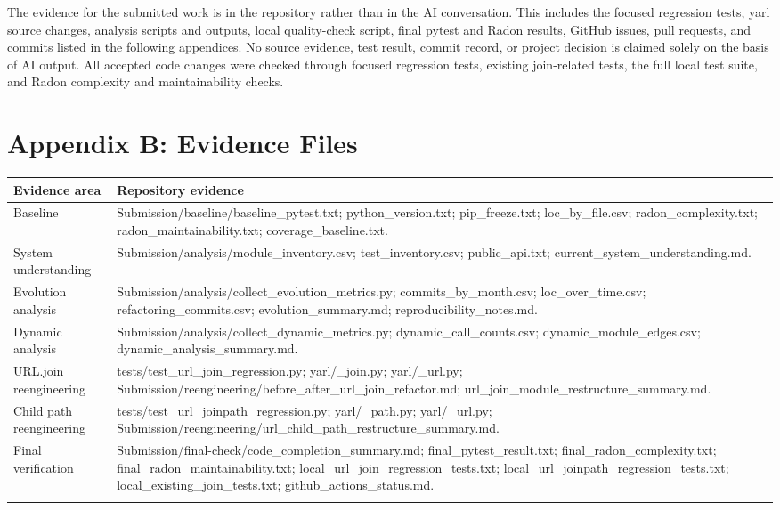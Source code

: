 \documentclass[11pt,a4paper]{article}
\begin{document}
The evidence for the submitted work is in the repository rather than in the AI conversation. This includes the focused regression tests, yarl source changes, analysis scripts and outputs, local quality-check script, final pytest and Radon results, GitHub issues, pull requests, and commits listed in the following appendices. No source evidence, test result, commit record, or project decision is claimed solely on the basis of AI output. All accepted code changes were checked through focused regression tests, existing join-related tests, the full local test suite, and Radon complexity and maintainability checks.


\section*{Appendix B: Evidence Files}


\begin{longtable}{p{} p{}}
\toprule
Evidence area & Repository evidence \\
\midrule
Baseline & Submission/baseline/baseline\_pytest.txt; python\_version.txt; pip\_freeze.txt; loc\_by\_file.csv; radon\_complexity.txt; radon\_maintainability.txt; coverage\_baseline.txt. \\
\addlinespace
System understanding & Submission/analysis/module\_inventory.csv; test\_inventory.csv; public\_api.txt; current\_system\_understanding.md. \\
\addlinespace
Evolution analysis & Submission/analysis/collect\_evolution\_metrics.py; commits\_by\_month.csv; loc\_over\_time.csv; refactoring\_commits.csv; evolution\_summary.md; reproducibility\_notes.md. \\
\addlinespace
Dynamic analysis & Submission/analysis/collect\_dynamic\_metrics.py; dynamic\_call\_counts.csv; dynamic\_module\_edges.csv; dynamic\_analysis\_summary.md. \\
\addlinespace
URL.join reengineering & tests/test\_url\_join\_regression.py; yarl/\_join.py; yarl/\_url.py; Submission/reengineering/before\_after\_url\_join\_refactor.md; url\_join\_module\_restructure\_summary.md. \\
\addlinespace
Child path reengineering & tests/test\_url\_joinpath\_regression.py; yarl/\_path.py; yarl/\_url.py; Submission/reengineering/url\_child\_path\_restructure\_summary.md. \\
\addlinespace
Final verification & Submission/final-check/code\_completion\_summary.md; final\_pytest\_result.txt; final\_radon\_complexity.txt; final\_radon\_maintainability.txt; local\_url\_join\_regression\_tests.txt; local\_url\_joinpath\_regression\_tests.txt; local\_existing\_join\_tests.txt; github\_actions\_status.md. \\
\addlinespace
\bottomrule
\end{longtable}
\end{document}
